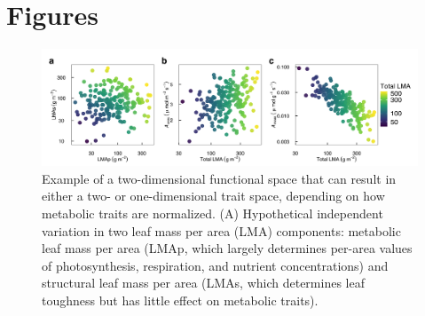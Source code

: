 \documentclass[
  12pt,
]{article}
\providecommand{\DIFaddbeginFL}{} %
\providecommand{\DIFdelbeginFL}{} %
\providecommand{\DIFdelendFL}{} %
\newcommand{\DIFscaledelfig}{0.5}
\newlength{\DIFdelgraphicswidth} %
\newlength{\DIFdelgraphicsheight} %
\newcommand{\DIFaddincludegraphics}[2][]{{\color{blue}\fbox{\DIFOincludegraphics[#1]{#2}}}} %
\newcommand{\DIFdelincludegraphics}[2][]{%
\sbox{\DIFdelgraphicsbox}{\DIFOincludegraphics[#1]{#2}}%
\settoboxwidth{\DIFdelgraphicswidth}{\DIFdelgraphicsbox} %
\settoboxtotalheight{\DIFdelgraphicsheight}{\DIFdelgraphicsbox} %
\scalebox{\DIFscaledelfig}{%
\parbox[b]{\DIFdelgraphicswidth}{\usebox{\DIFdelgraphicsbox}\\[-\baselineskip] \rule{\DIFdelgraphicswidth}{0em}}\llap{\resizebox{\DIFdelgraphicswidth}{\DIFdelgraphicsheight}{%
\setlength{\unitlength}{\DIFdelgraphicswidth}%
\begin{picture}(1,1)%
\thicklines\linethickness{2pt} %
{\color[rgb]{1,0,0}\put(0,0){\framebox(1,1){}}}%
{\color[rgb]{1,0,0}\put(0,0){\line( 1,1){1}}}%
{\color[rgb]{1,0,0}\put(0,1){\line(1,-1){1}}}%
\end{picture}%
}\hspace*{3pt}}} %
} %
\DeclareRobustCommand{\DIFaddbeginFL}{\DIFOaddbeginFL \let\includegraphics\DIFaddincludegraphics} %
\DeclareRobustCommand{\DIFdelbeginFL}{\DIFOdelbeginFL \let\includegraphics\DIFdelincludegraphics} %
\DeclareRobustCommand{\DIFdelendFL}{\DIFOaddendFL \let\includegraphics\DIFOincludegraphics} %
\begin{document}
\newpage

\hypertarget{figures}{%
\section{Figures}\label{figures}}

\begin{figure}
\DIFdelbeginFL %
\DIFdelendFL \DIFaddbeginFL \hypertarget{fig:Hplt}{%
\centering
\includegraphics{../figs/fig_hypo.png}
\caption{Example of a two-dimensional functional space that can result in either a two- or one-dimensional trait space, depending on how metabolic traits are normalized. (A) Hypothetical independent variation in two leaf mass per area (LMA) components: metabolic leaf mass per area (LMAp, which largely determines per-area values of photosynthesis, respiration, and nutrient concentrations) and structural leaf mass per area (LMAs, which determines leaf toughness but has little effect on metabolic traits).
}}
\end{figure}
\end{document}
